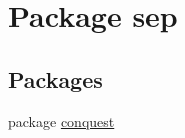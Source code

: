 \hypertarget{namespacesep}{
\section{Package sep}
\label{namespacesep}
}
\subsection*{Packages}
\begin{DoxyCompactItemize}
\item 
package \hyperlink{namespacesep_1_1conquest}{conquest}
\end{DoxyCompactItemize}
